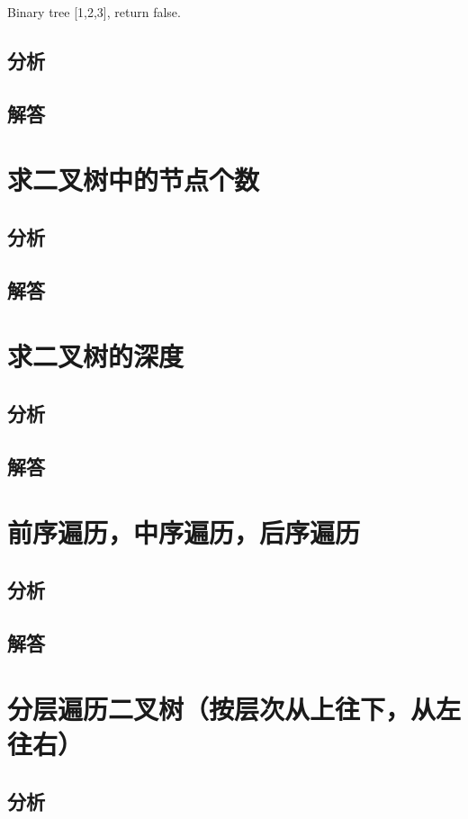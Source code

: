\documentclass[UTF8,a4paper,12pt]{ctexbook}
\begin{document}
		Binary tree [1,2,3], return false.
	\subsection{分析}
	
	\subsection{解答}
	
\section{求二叉树中的节点个数}
	\subsection{分析}
	
	\subsection{解答}
	
\section{求二叉树的深度}
	\subsection{分析}
	
	\subsection{解答}
	
\section{前序遍历，中序遍历，后序遍历}
	\subsection{分析}
	
	\subsection{解答}
	
\section{分层遍历二叉树（按层次从上往下，从左往右）}
	\subsection{分析}
	
\end{document}
